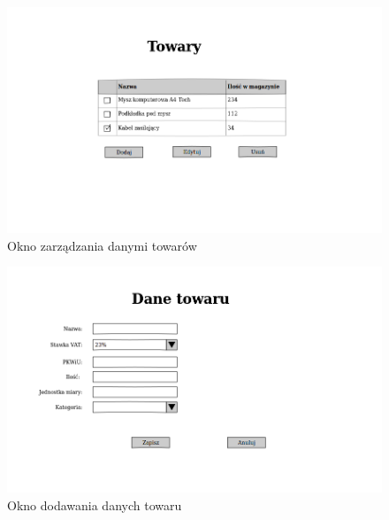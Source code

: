 \begin{figure}[!htb]
  \begin{center}
    \includegraphics[scale=0.45]{../img/interfejs/zarzadzanie-towarami.png}
  \end{center}
  \caption{Okno zarządzania danymi towarów}
\end{figure}
\FloatBarrier

\begin{figure}[!htb]
  \begin{center}
    \includegraphics[scale=0.45]{../img/interfejs/dodanie-danych-towaru.png}
  \end{center}
  \caption{Okno dodawania danych towaru}
\end{figure}
\FloatBarrier

